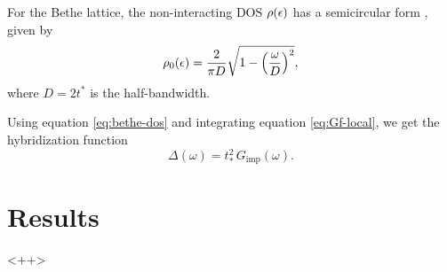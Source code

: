 \documentclass[12pt]{report}
\begin{document}
For the Bethe lattice, the non-interacting DOS $\rho(\epsilon)$ has a semicircular form \cite{georges1996}, given by
\begin{equation} \label{eq:bethe-dos}
\rho_0(\epsilon) = \frac{2}{\pi D} \sqrt{1-\qty(\frac{\omega}{D})^2},
\end{equation}
where $D = 2t^*$ is the half-bandwidth.

Using equation \ref{eq:bethe-dos} and integrating equation \ref{eq:Gf-local}, we get the hybridization function \cite{thesis_bruno}
$$
\Delta(\omega) = t_*^2 \, G_{\text{imp}}(\omega).
$$

\section{Results}

<++>
\end{document}
